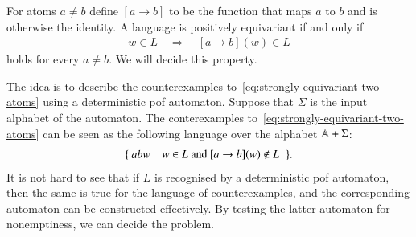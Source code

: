 {
    For atoms $a \neq b$ define $[a \to b]$ to be the function that maps $a$ to $b$ and is otherwise the identity.  A language is positively equivariant if and only if 
    \begin{align}\label{eq:strongly-equivariant-two-atoms}
    w \in L  \quad \Rightarrow \quad [a \to b](w) \in L
    \end{align}
    holds for every $a \neq b$. We will decide this property. 

    The idea is to describe the counterexamples to~\eqref{eq:strongly-equivariant-two-atoms} using a deterministic pof automaton. Suppose that $\Sigma$ is the input alphabet of the automaton. The conterexamples to~\eqref{eq:strongly-equivariant-two-atoms} can be seen as the following  language over the alphabet $\mathbb A + \Sigma$: 
    \begin{align*}
    \setbuild{ab w}{$w \in L$ and $[a \to b](w) \not\in L$}.
    \end{align*}
    It is not hard to see that if $L$ is recognised by a deterministic pof automaton, then the same is true for the language of counterexamples, and the corresponding automaton can be constructed effectively. By testing the latter automaton for nonemptiness, we can decide the problem. 
}